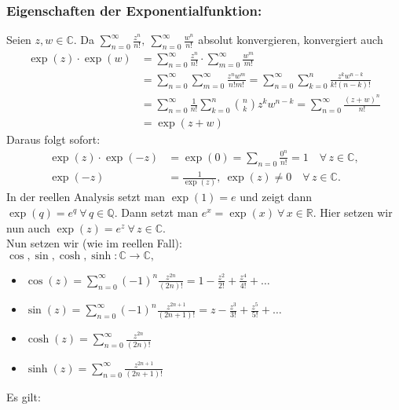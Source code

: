 \documentclass[a4paper,12pt]{article}
\theoremstyle{newthm}
\theoremstyle{newdef}
\theoremstyle{newrem}
\newcommand{\Q}{\mathbb{Q}}
\newcommand{\R}{\mathbb{R}}
\newcommand{\C}{\mathbb{C}}
\begin{document}
		\subsubsection*{Eigenschaften der Exponentialfunktion:}
		Seien $z,w \in \C$. Da $ \sum\limits_{n=0}^\infty \frac{z^n}{n!},\ \sum\limits_{n=0}^\infty \frac{w^n}{n!} $ absolut konvergieren, konvergiert auch
		\begin{align*}
			\exp(z) \cdot \exp(w) &= \sum_{n=0}^\infty \frac{z^n}{n!} \cdot \sum_{m=0}^\infty \frac{w^m}{m!}\\
			&= \sum_{n=0}^\infty \sum_{m=0}^\infty \frac{z^nw^m}{n!m!} = \sum_{n=0}^\infty \sum_{k=0}^n \frac{z^kw^{n-k}}{k!(n-k)!}\\
			&= \sum_{n=0}^\infty \frac{1}{n!} \sum_{k=0}^n \binom{n}{k} z^kw^{n-k} = \sum_{n=0}^\infty \frac{(z+w)^n}{n!}\\
			&= \exp(z+w)
		\end{align*}
		Daraus folgt sofort:
		\begin{align*}
			\exp(z) \cdot \exp(-z) &= \exp(0) = \sum_{n=0} \frac{0^n}{n!} = 1 \quad \forall\, z \in \C,\\
			\exp(-z) &= \frac{1}{\exp(z)},\ \exp(z) \neq 0 \quad \forall\, z \in \C.
		\end{align*}
		In der reellen Analysis setzt man $\exp(1)=e$ und zeigt dann $ \exp(q) = e^q \ \forall\, q \in \Q $. Dann setzt man $ e^x = \exp(x) \ \forall\, x \in \R. $ Hier setzen wir nun auch $ \exp(z) = e^z \ \forall\, z \in \C $.\\
		Nun setzen wir (wie im reellen Fall):\\
		$ \cos,\sin,\cosh,\sinh : \C \to \C, $
		\begin{itemize}
			\item $ \cos(z) = \sum\limits_{n=0}^\infty (-1)^n \frac{z^{2n}}{(2n)!} = 1-\frac{z^2}{2!} + \frac{z^4}{4!} + \dots $
			\item $ \sin(z) = \sum\limits_{n=0}^\infty (-1)^n \frac{z^{2n+1}}{(2n+1)!} = z - \frac{z^3}{3!} + \frac{z^5}{5!} + \dots $
			\item $ \cosh(z) = \sum\limits_{n=0}^\infty \frac{z^{2n}}{(2n)!} $
			\item $ \sinh(z) = \sum\limits_{n=0}^\infty \frac{z^{2n+1}}{(2n+1)!} $
		\end{itemize}
		Es gilt:
\end{document}
